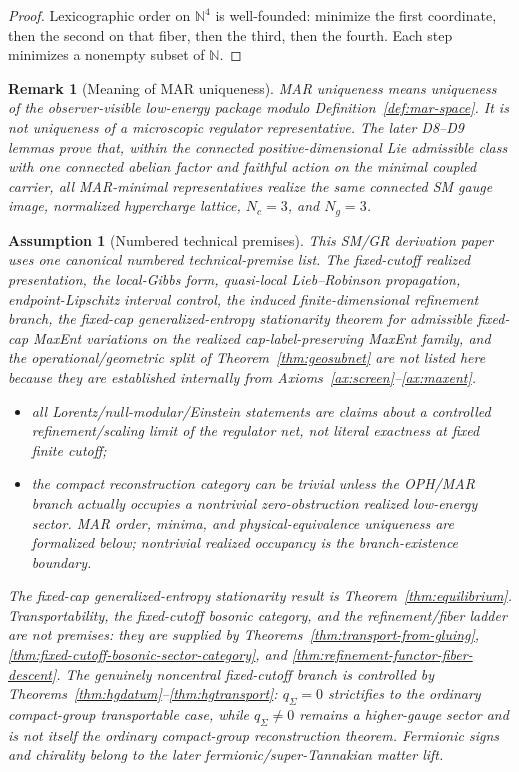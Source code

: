 \documentclass[11pt]{article}
\newtheorem{assumption}[theorem]{Assumption}
\newtheorem{remark}[theorem]{Remark}
\begin{document}
\begin{proof}
Lexicographic order on \(\mathbb N^4\) is well-founded: minimize the first coordinate, then the second on that fiber, then the third, then the fourth. Each step minimizes a nonempty subset of \(\mathbb N\).
\end{proof}

\begin{remark}[Meaning of MAR uniqueness]\label{rem:mar-uniqueness}
MAR uniqueness means uniqueness of the observer-visible low-energy package modulo Definition~\ref{def:mar-space}. It is not uniqueness of a microscopic regulator representative. The later D8--D9 lemmas prove that, within the connected positive-dimensional Lie admissible class with one connected abelian factor and faithful action on the minimal coupled carrier, all MAR-minimal representatives realize the same connected SM gauge image, normalized hypercharge lattice, \(N_c=3\), and \(N_g=3\).
\end{remark}

\begin{assumption}[Numbered technical premises]\label{ass:technical}
This SM/GR derivation paper uses one canonical numbered technical-premise list. The fixed-cutoff realized presentation, the local-Gibbs form, quasi-local Lieb--Robinson propagation, endpoint-Lipschitz interval control, the induced finite-dimensional refinement branch, the fixed-cap generalized-entropy stationarity theorem for admissible fixed-cap MaxEnt variations on the realized cap-label-preserving MaxEnt family, and the operational/geometric split of Theorem~\ref{thm:geosubnet} are not listed here because they are established internally from Axioms~\ref{ax:screen}--\ref{ax:maxent}.
\begin{itemize}[leftmargin=2.3em]
\item[\textbf{T1}] all Lorentz/null-modular/Einstein statements are claims about a controlled refinement/scaling limit of the regulator net, not literal exactness at fixed finite cutoff;
\item[\textbf{T2}] the compact reconstruction category can be trivial unless the OPH/MAR branch actually occupies a nontrivial zero-obstruction realized low-energy sector. MAR order, minima, and physical-equivalence uniqueness are formalized below; nontrivial realized occupancy is the branch-existence boundary.
\end{itemize}
The fixed-cap generalized-entropy stationarity result is Theorem~\ref{thm:equilibrium}. Transportability, the fixed-cutoff bosonic category, and the refinement/fiber ladder are not premises: they are supplied by Theorems~\ref{thm:transport-from-gluing}, \ref{thm:fixed-cutoff-bosonic-sector-category}, and \ref{thm:refinement-functor-fiber-descent}. The genuinely noncentral fixed-cutoff branch is controlled by Theorems~\ref{thm:hgdatum}--\ref{thm:hgtransport}: \(q_\Sigma=0\) strictifies to the ordinary compact-group transportable case, while \(q_\Sigma\ne0\) remains a higher-gauge sector and is not itself the ordinary compact-group reconstruction theorem. Fermionic signs and chirality belong to the later fermionic/super-Tannakian matter lift.
\end{assumption}
\end{document}
